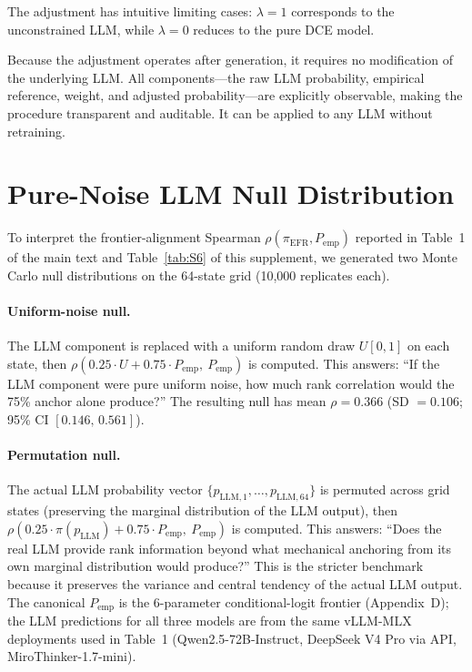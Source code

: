 \documentclass[11pt]{article}
\begin{document}
The adjustment has intuitive limiting cases: $\lambda=1$ corresponds to the unconstrained LLM, while $\lambda=0$ reduces to the pure DCE model.

Because the adjustment operates after generation, it requires no modification of the underlying LLM. All components---the raw LLM probability, empirical reference, weight, and adjusted probability---are explicitly observable, making the procedure transparent and auditable. It can be applied to any LLM without retraining.

\renewcommand{\thetable}{S\arabic{table}}
\setcounter{table}{0}

\section{Pure-Noise LLM Null Distribution}
\label{sec:null_distribution}

To interpret the frontier-alignment Spearman $\rho(\pi_{\text{EFR}}, P_{\text{emp}})$ reported in Table~1 of the main text and Table~\ref{tab:S6} of this supplement, we generated two Monte Carlo null distributions on the 64-state grid (10{,}000 replicates each).

\paragraph{Uniform-noise null.} The LLM component is replaced with a uniform random draw $U[0, 1]$ on each state, then $\rho(0.25 \cdot U + 0.75 \cdot P_{\text{emp}},\ P_{\text{emp}})$ is computed. This answers: ``If the LLM component were pure uniform noise, how much rank correlation would the 75\% anchor alone produce?'' The resulting null has mean $\rho = 0.366$ (SD $= 0.106$; 95\% CI $[0.146,\,0.561]$).

\paragraph{Permutation null.} The actual LLM probability vector $\{p_{\text{LLM},1}, \ldots, p_{\text{LLM},64}\}$ is permuted across grid states (preserving the marginal distribution of the LLM output), then $\rho(0.25 \cdot \pi(p_{\text{LLM}}) + 0.75 \cdot P_{\text{emp}},\ P_{\text{emp}})$ is computed. This answers: ``Does the real LLM provide rank information beyond what mechanical anchoring from its own marginal distribution would produce?'' This is the stricter benchmark because it preserves the variance and central tendency of the actual LLM output. The canonical $P_{\text{emp}}$ is the 6-parameter conditional-logit frontier (Appendix~D); the LLM predictions for all three models are from the same vLLM-MLX deployments used in Table~1 (Qwen2.5-72B-Instruct, DeepSeek V4 Pro via API, MiroThinker-1.7-mini).
\end{document}
